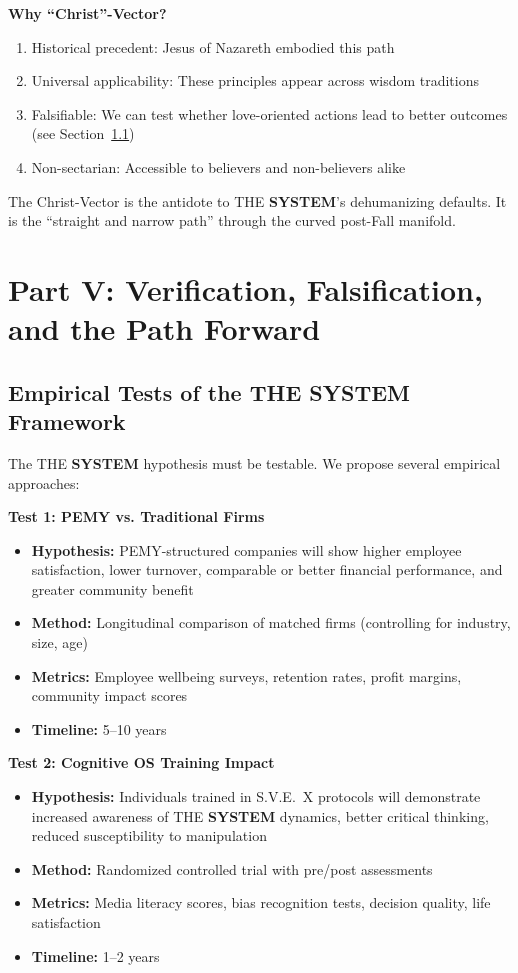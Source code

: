 \documentclass[11pt,a4paper]{article}
\newcommand{\SYSTEM}{\textbf{SYSTEM}}
\theoremstyle{definition}
\theoremstyle{remark}
\begin{document}
\textbf{Why ``Christ''-Vector?}
\begin{enumerate}
    \item Historical precedent: Jesus of Nazareth embodied this path
    \item Universal applicability: These principles appear across wisdom traditions
    \item Falsifiable: We can test whether love-oriented actions lead to better outcomes (see Section~\ref{sec:empirical_tests})
    \item Non-sectarian: Accessible to believers and non-believers alike
\end{enumerate}

The Christ-Vector is the antidote to THE \SYSTEM{}'s dehumanizing defaults. It is the ``straight and narrow path'' through the curved post-Fall manifold.

\newpage

\section{Part V: Verification, Falsification, and the Path Forward}

\subsection{Empirical Tests of the THE \SYSTEM{} Framework}
\label{sec:empirical_tests}

The THE \SYSTEM{} hypothesis must be testable. We propose several empirical approaches:

\textbf{Test 1: PEMY vs. Traditional Firms}
\begin{itemize}
    \item \textbf{Hypothesis:} PEMY-structured companies will show higher employee satisfaction, lower turnover, comparable or better financial performance, and greater community benefit
    \item \textbf{Method:} Longitudinal comparison of matched firms (controlling for industry, size, age)
    \item \textbf{Metrics:} Employee wellbeing surveys, retention rates, profit margins, community impact scores
    \item \textbf{Timeline:} 5--10 years
\end{itemize}

\textbf{Test 2: Cognitive OS Training Impact}
\begin{itemize}
    \item \textbf{Hypothesis:} Individuals trained in S.V.E.~X protocols will demonstrate increased awareness of THE \SYSTEM{} dynamics, better critical thinking, reduced susceptibility to manipulation
    \item \textbf{Method:} Randomized controlled trial with pre/post assessments
    \item \textbf{Metrics:} Media literacy scores, bias recognition tests, decision quality, life satisfaction
    \item \textbf{Timeline:} 1--2 years
\end{itemize}
\end{document}
